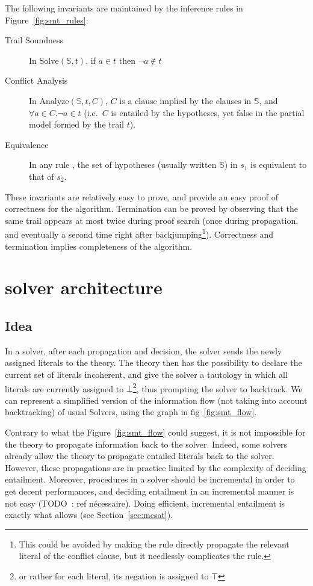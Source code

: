 \documentclass{article}
\begin{document}
The following invariants are maintained by the inference rules in Figure~\ref{fig:smt_rules}:
\begin{description}
  \item[Trail Soundness] In $\text{Solve}(\mathbb{S}, t)$, if $a \in t$ then $\neg a \notin t$
  \item[Conflict Analysis] In $\text{Analyze}(\mathbb{S}, t, C)$, $C$ is a clause implied by the
    clauses in $\mathbb{S}$, and $\forall a \in C. \neg a \in t$ (i.e.~$C$ is entailed by the
    hypotheses, yet false in the partial model formed by the trail $t$).
  \item[Equivalence] In any rule \DP{}, the set of hypotheses
    (usually written $\mathbb{S}$) in $s_1$ is equivalent to that of $s_2$.
\end{description}

These invariants are relatively easy to prove, and provide an easy proof of correctness for
the \cdcl{} algorithm. Termination can be proved by observing that the same trail appears
at most twice during proof search (once during propagation, and eventually a second time
right after backjumping\footnote{This could be avoided by making the  rule
directly propagate the relevant literal of the conflict clause, but it needlessly
complicates the rule.}). Correctness and termination implies completeness of the \sat{}
algorithm.


\section{\smt{} solver architecture}\label{sec:smt}

\subsection{Idea}\label{sec:smt_flow}

In a \smt{} solver, after each propagation and decision, the solver sends the newly
assigned literals to the theory. The theory then has the possibility to declare the
current set of literals incoherent, and give the solver a tautology in which all
literals are currently assigned to $\bot$\footnote{or rather for each literal, its negation
is assigned to $\top$}, thus prompting the solver to backtrack.
We can represent a simplified version of the information flow (not taking into
account backtracking) of usual \smt{} Solvers, using the graph in fig~\ref{fig:smt_flow}.

Contrary to what the Figure~\ref{fig:smt_flow} could suggest, it is not impossible
for the theory to propagate information back to the \sat{} solver. Indeed,
some \smt{} solvers already allow the theory to propagate entailed literals back to the
\sat{} solver. However, these propagations are in practice limited by the complexity
of deciding entailment. Moreover, procedures in a \smt{} solver should be incremental
in order to get decent performances, and deciding entailment in an incremental manner
is not easy (TODO~: ref nécessaire). Doing efficient, incremental entailment is exactly
what \mcsat{} allows (see Section~\ref{sec:mcsat}).
\end{document}
